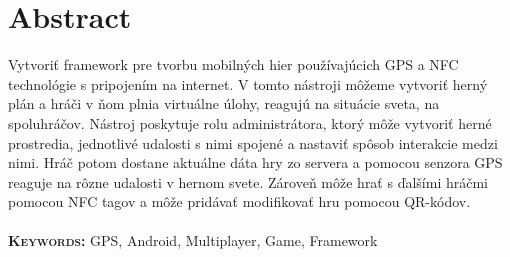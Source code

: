\chapter{Abstract}
Vytvoriť framework pre tvorbu mobilných hier používajúcich GPS a NFC technológie s pripojením na internet. V tomto nástroji môžeme vytvoriť herný plán a hráči v ňom plnia virtuálne úlohy, reagujú na situácie sveta, na spoluhráčov. Nástroj poskytuje rolu administrátora, ktorý môže vytvoriť herné prostredia, jednotlivé udalosti s nimi spojené a nastaviť spôsob interakcie medzi nimi. Hráč potom dostane aktuálne dáta hry zo servera a pomocou senzora GPS reaguje na rôzne udalosti v hernom svete. Zároveň môže hrať s ďalšími hráčmi pomocou NFC tagov a môže pridávať modifikovať hru pomocou QR-kódov.\\ \\
\textbf{\textsc{Keywords:}} GPS, Android, Multiplayer, Game, Framework
